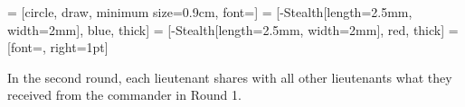  = [circle, draw, minimum size=0.9cm, font=\small]
 = [-{Stealth[length=2.5mm, width=2mm]}, blue, thick] %
 = [-{Stealth[length=2.5mm, width=2mm]}, red, thick]  %
 = [font=\scriptsize, right=1pt]

\usepackage{caption}

\newsavebox{\mainTableBox}
\newlength{\mainTableHeight}
\newlength{\mainTableWidth}
\newlength{\senderLabelAreaHeight}
\newlength{\majorityLabelAreaHeight}


In the second round, each lieutenant shares with all other lieutenants what they received from the commander in Round 1.

